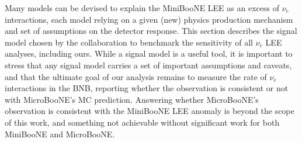 \documentclass[a4paper]{article}
\begin{document}
\par  Many models can be devised to explain the MiniBooNE LEE as an excess of $\nu_e$ interactions, each model relying on a given (new) physics production mechanism and set of assumptions on the detector response. This section describes the signal model chosen by the collaboration to benchmark the sensitivity of all $\nu_e$ LEE analyses, including ours.  While a signal model is a useful tool, it is important to stress that any signal model carries a set of important assumptions and caveats, and that the ultimate goal of our analysis remains to measure the rate of $\nu_e$ interactions in the BNB, reporting whether the observation is consistent or not with MicroBooNE's MC prediction. Answering whether MicroBooNE's observation is consistent with the MiniBooNE LEE anomaly is beyond the scope of this work, and something not achievable without significant work for both MiniBooNE and MicroBooNE.

\end{document}
